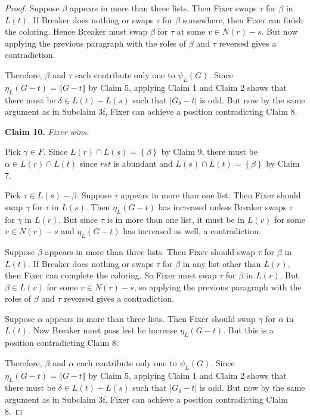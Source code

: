 \documentclass[12pt,reqno]{amsart}
\theoremstyle{plain}
\theoremstyle{definition}
\theoremstyle{remark}
\newcommand{\set}[1]{\left\{ #1 \right\}}
\newcommand{\card}[1]{\left|#1\right|}
\newcommand{\size}[1]{\left\Vert#1\right\Vert}
\begin{document}
\begin{proof}
Suppose $\beta$ appears in more than three lists. Then Fixer swaps $\tau$ for $\beta$ in $L(t)$.  If Breaker does nothing or swaps $\tau$ for $\beta$ somewhere, then Fixer can finish the coloring.  Hence Breaker must swap $\beta$ for $\tau$ at some $v \in N(r) - s$.  But now applying the previous paragraph with the roles of $\beta$ and $\tau$ reversed gives a contradiction.

Therefore, $\beta$ and $\tau$ each contribute only one to $\psi_L(G)$. Since $\eta_L(G-t) = \size{G-t}$ by Claim 5, applying Claim 1 and Claim 2 shows that there must be $\delta \in L(t) - L(s)$ such that $\card{G_\delta - t}$ is odd.  But now by the same argument as in Subclaim 3f, Fixer can achieve a position contradicting Claim 8.

\noindent\textbf{Claim 10.  }\textit{Fixer wins.}

Pick $\gamma \in F$.  Since $L(r) \cap L(s) = \set{\beta}$ by Claim 9, there must be $\alpha \in L(r) \cap L(t)$ since $rst$ is abundant and $L(s) \cap L(t) = \set{\beta}$ by Claim 7.

Pick $\tau \in L(s) - \beta$.  Suppose $\tau$ appears in more than one list.  Then Fixer should swap $\gamma$ for $\tau$ in $L(s)$.  Then $\eta_L(G - t)$ has increased unless Breaker swaps $\tau$ for $\gamma$ in $L(r)$.  But since $\tau$ is in more than one list, it must be in $L(v)$ for some $v \in N(r) - s$ and $\eta_L(G - t)$ has increased as well, a contradiction.

Suppose $\beta$ appears in more than three lists.  Then Fixer should swap $\tau$ for $\beta$ in $L(t)$.  If Breaker does nothing or swaps $\tau$ for $\beta$ in any list other than $L(r)$, then Fixer can complete the coloring.  So Fixer must swap $\tau$ for $\beta$ in $L(r)$.  But $\beta \in L(v)$ for some $v \in N(r) - s$, so applying the previous paragraph with the roles of $\beta$ and $\tau$ reversed gives a contradiction.

Suppose $\alpha$ appears in more than three lists.  Then Fixer should swap $\gamma$ for $\alpha$ in $L(t)$. Now Breaker must pass lest he increase $\eta_L(G - t)$.  But this is a position contradicting Claim 8.

Therefore, $\beta$ and $\alpha$ each contribute only one to $\psi_L(G)$. Since $\eta_L(G-t) = \size{G-t}$ by Claim 5, applying Claim 1 and Claim 2 shows that there must be $\delta \in L(t) - L(s)$ such that $\card{G_\delta - t}$ is odd.  But now by the same argument as in Subclaim 3f, Fixer can achieve a position contradicting Claim 8.
\end{proof}
\end{document}
